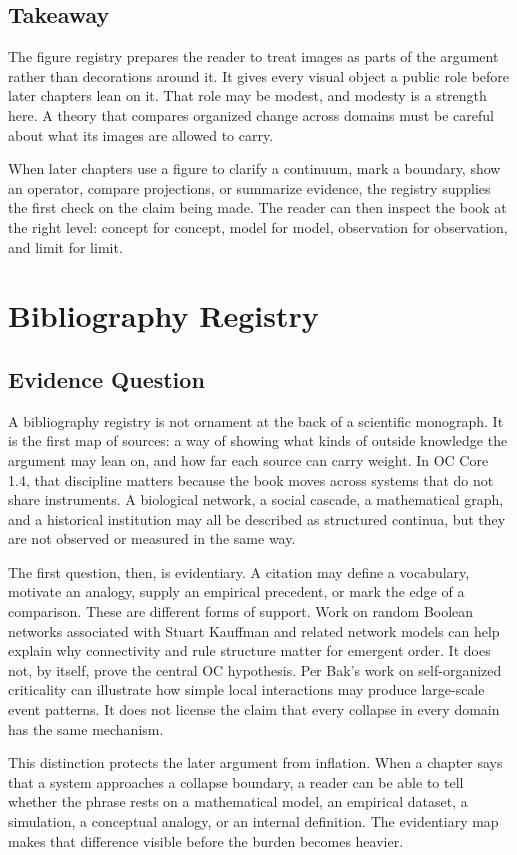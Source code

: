 \documentclass[11pt,a4paper,openany]{book}
\begin{document}
\subsection{Takeaway}
The figure registry prepares the reader to treat images as parts of the argument rather than decorations around it. It gives every visual object a public role before later chapters lean on it. That role may be modest, and modesty is a strength here. A theory that compares organized change across domains must be careful about what its images are allowed to carry. \cite{kauffman_autocatalytic,raf_networks}\par
When later chapters use a figure to clarify a continuum, mark a boundary, show an operator, compare projections, or summarize evidence, the registry supplies the first check on the claim being made. The reader can then inspect the book at the right level: concept for concept, model for model, observation for observation, and limit for limit.\par
\section{Bibliography Registry}
\subsection{Evidence Question}
A bibliography registry is not ornament at the back of a scientific monograph. It is the first map of sources: a way of showing what kinds of outside knowledge the argument may lean on, and how far each source can carry weight. In OC Core 1.4, that discipline matters because the book moves across systems that do not share instruments. A biological network, a social cascade, a mathematical graph, and a historical institution may all be described as structured continua, but they are not observed or measured in the same way. \cite{raf_networks,bak_soc}\par
The first question, then, is evidentiary. A citation may define a vocabulary, motivate an analogy, supply an empirical precedent, or mark the edge of a comparison. These are different forms of support. Work on random Boolean networks associated with Stuart Kauffman and related network models can help explain why connectivity and rule structure matter for emergent order. It does not, by itself, prove the central OC hypothesis. Per Bak's work on self-organized criticality can illustrate how simple local interactions may produce large-scale event patterns. It does not license the claim that every collapse in every domain has the same mechanism.\par
This distinction protects the later argument from inflation. When a chapter says that a system approaches a collapse boundary, a reader can be able to tell whether the phrase rests on a mathematical model, an empirical dataset, a simulation, a conceptual analogy, or an internal definition. The evidentiary map makes that difference visible before the burden becomes heavier.\par
\end{document}
